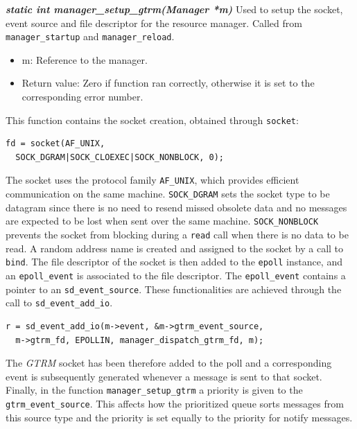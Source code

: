 \documentclass[nobiblatex]{LTHthesis}
\begin{document}
\begin{framed}
	\begin{flushleft}
		\textbf{\emph{{static int manager\_setup\_gtrm(Manager *m)}}} 
	\newline
		Used to setup the socket, event source and file descriptor for the
	resource manager. Called from \texttt{manager\_startup} and 
	\texttt{manager\_reload}.
		\begin{itemize}
		\item m: Reference to the manager.
		\item Return value: Zero if function ran correctly, otherwise it is 
	  set to the corresponding error number.
		\end{itemize}
	\end{flushleft}	
\end{framed}
\newpage
This function contains the socket creation, obtained through
\texttt{socket}:
\begin{verbatim}
fd = socket(AF_UNIX, 
  SOCK_DGRAM|SOCK_CLOEXEC|SOCK_NONBLOCK, 0);
\end{verbatim}
The socket uses the protocol family \texttt{AF\_UNIX}, which provides
efficient communication on the same machine. \texttt{SOCK\_DGRAM} sets 
the socket type to be datagram since there is no need to resend missed
obsolete data and no messages are expected to be lost when sent over the 
same machine. \texttt{SOCK\_NONBLOCK} prevents the socket from blocking 
during a \texttt{read} call when there is no data to be read. A random 
address name is created and assigned to the socket by a call to 
\texttt{bind}. The file descriptor of the socket is then added to the 
\texttt{epoll} instance, and an \texttt{epoll\_event} is associated to
the file descriptor. The \texttt{epoll\_event} contains a pointer to 
an \texttt{sd\_event\_source}. These functionalities are achieved through
the call to \texttt{sd\_event\_add\_io}.

\begin{verbatim}
r = sd_event_add_io(m->event, &m->gtrm_event_source, 
  m->gtrm_fd, EPOLLIN, manager_dispatch_gtrm_fd, m);
\end{verbatim}

The \emph{GTRM} socket has been therefore added to the poll and a corresponding 
event is subsequently generated whenever a message is sent to that socket. 
Finally, in the function \texttt{manager\_setup\_gtrm} a priority is given
to the \texttt{gtrm\_event\_source}. This affects how the prioritized 
queue sorts messages from this source type and the priority is set equally
to the priority for notify messages.
\end{document}
